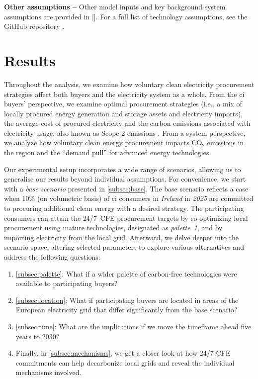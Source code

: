 \documentclass[11pt, 5p, nopreprintline]{elsarticle}
\begin{document}
\textbf{Other assumptions --} Other model inputs and key background system assumptions are provided in []. For a full list of technology assumptions, see the GitHub repository \cite{github-247CFEpaper}.

\section{Results}
\label{sec:results}

Throughout the analysis, we examine how voluntary clean electricity procurement strategies affect both buyers and the electricity system as a whole.
From the \gls{ci} buyers' perspective, we examine optimal procurement strategies (i.e., a mix of locally procured energy generation and storage assets and electricity imports), the average cost of procured electricity and the carbon emissions associated with electricity usage, also known as Scope 2 emissions \cite{GHGProtocolScope2}.
From a system perspective, we analyze how voluntary clean energy procurement impacts CO$_2$ emissions in the region and the \enquote{demand pull} for advanced energy technologies.

Our experimental setup incorporates a wide range of scenarios, allowing us to generalise our results beyond individual assumptions.
For convenience, we start with a \textit{base scenario} presented in \cref{subsec:base}.
The base scenario reflects a case when 10\% (on volumetric basis) of \gls{ci} consumers in \textit{Ireland} in \textit{2025} are committed to procuring additional clean energy with a desired strategy.
The participating consumers can attain the 24/7~CFE procurement targets by co-optimizing local procurement using mature technologies, designated as \textit{palette~1}, and by importing electricity from the local grid.
Afterward, we delve deeper into the scenario space, altering selected parameters to explore various alternatives and address the following questions:

\begin{enumerate}[-]
\item \cref{subsec:palette}: What if a wider palette of carbon-free technologies were available to participating buyers?
\item \cref{subsec:location}: What if participating buyers are located in areas of the European electricity grid that differ significantly from the base scenario?
\item \cref{subsec:time}: What are the implications if we move the timeframe ahead five years to 2030?
\item Finally, in \cref{subsec:mechanisms}, we get a closer look at how 24/7 CFE commitments can help decarbonize local grids and reveal the individual mechanisms involved.
\end{enumerate}
\end{document}
